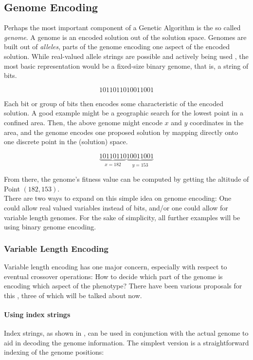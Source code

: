 \documentclass[11pt,a4paper,twoside,openright]{scrbook}
\begin{document}
\subsection{Genome Encoding}
Perhaps the most important component of a Genetic Algorithm is the so called \emph{genome}.
A genome is an encoded solution out of the solution space. Genomes are built out of \emph{alleles}, parts of the genome encoding one aspect of the encoded solution. While real-valued allele strings are possible and actively being used \cite[e.g.]{Wright91}, the most basic representation would be a fixed-size binary genome, that is, a string of bits.

\[1011011010011001\]

Each bit or group of bits then encodes some characteristic of the encoded solution. A good example might be a geographic search for the lowest point in a confined area. Then, the above genome might encode \(x\) and \(y\) coordinates in the area, and the genome encodes one proposed solution by mapping directly onto one discrete point in the (solution) space.

\[\underbrace{10110110}_{x=182}\underbrace{10011001}_{y=153}\]

From there, the genome's fitness value can be computed by getting the altitude of Point \((182,153)\).\\

There are two ways to expand on this simple idea on genome encoding: One could allow real valued variables instead of bits, and/or one could allow for variable length genomes. For the sake of simplicity, all further examples will be using binary genome encoding.

\subsubsection{Variable Length Encoding} Variable length encoding has one major concern, especially with respect to eventual crossover operations: How to decide which part of the genome is encoding which aspect of the phenotype? There have been various proposals for this \cite[e.g.]{Lee00,Mattiussi07}, three of which will be talked about now.

\paragraph{Using index strings}
Index strings, as shown in \cite{Lee00}, can be used in conjunction with the actual genome to aid in decoding the genome information. The simplest version is a straightforward indexing of the genome positions: \\
\end{document}
